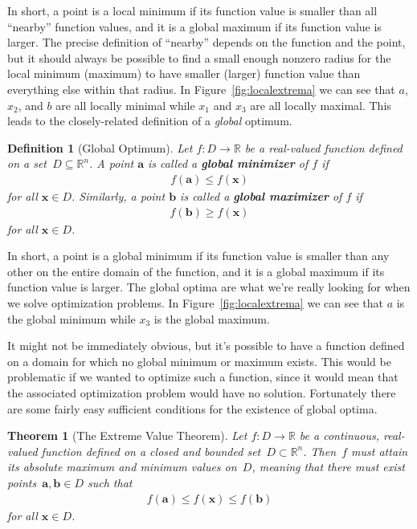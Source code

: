 \documentclass[11pt]{article}
\newtheorem*{definition}{Definition} %
\newtheorem{theorem}{Theorem}[section] %
\theoremstyle{definition} %
\begin{document}
In short, a point is a local minimum if its function value is smaller than all ``nearby'' function values, and it is a global maximum if its function value is larger. The precise definition of ``nearby'' depends on the function and the point, but it should always be possible to find a small enough nonzero radius for the local minimum (maximum) to have smaller (larger) function value than everything else within that radius. In Figure~\ref{fig:localextrema} we can see that $a$, $x_2$, and $b$ are all locally minimal while $x_1$ and $x_3$ are all locally maximal. This leads to the closely-related definition of a \textit{global} optimum.

\begin{definition}[Global Optimum]
	Let $f : D \to \mathbb{R}$ be a real-valued function defined on a set~\mbox{$D \subseteq \mathbb{R}^n$}. A point $\mathbf{a}$ is called a \textbf{global minimizer} of $f$ if
	\begin{align*}
		f(\mathbf{a}) \le f(\mathbf{x})
	\end{align*}
	for all $\mathbf{x} \in D$. Similarly, a point $\mathbf{b}$ is called a \textbf{global maximizer} of $f$ if
	\begin{align*}
		f(\mathbf{b}) \ge f(\mathbf{x})
	\end{align*}
	for all $\mathbf{x} \in D$.
\end{definition}

In short, a point is a global minimum if its function value is smaller than any other on the entire domain of the function, and it is a global maximum if its function value is larger. The global optima are what we're really looking for when we solve optimization problems. In Figure~\ref{fig:localextrema} we can see that $a$ is the global minimum while $x_3$ is the global maximum.

It might not be immediately obvious, but it's possible to have a function defined on a domain for which no global minimum or maximum exists. This would be problematic if we wanted to optimize such a function, since it would mean that the associated optimization problem would have no solution. Fortunately there are some fairly easy sufficient conditions for the existence of global optima.

\begin{theorem}[The Extreme Value Theorem]
\label{thm:extreme}
	Let $f : D \to \mathbb{R}$ be a continuous, real-valued function defined on a closed and bounded set~$D \subset \mathbb{R}^n$. Then~$f$ must attain its absolute maximum and minimum values on~$D$, meaning that there must exist points~$\mathbf{a}, \mathbf{b} \in D$ such that
	\begin{align*}
		f(\mathbf{a}) \le f(\mathbf{x}) \le f(\mathbf{b})
	\end{align*}
	for all $\mathbf{x} \in D$.
\end{theorem}
\end{document}
